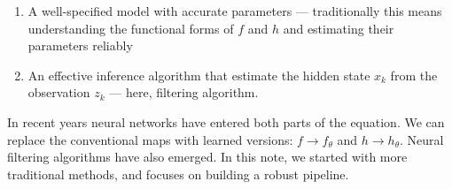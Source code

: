 \documentclass{article}
\begin{document}
\begin{enumerate}
    \item  A well-specified model with accurate parameters — traditionally this means understanding the functional forms of $f$ and $h$ and estimating their parameters reliably
    \item An effective inference algorithm that estimate the hidden state $x_k$ from the observation $z_k$ — here, filtering algorithm.
    \end{enumerate}
In recent years neural networks have entered both parts of the equation. We can replace the conventional maps with learned versions: $f \to f_\theta$ and $h \to h_\theta$. Neural filtering algorithms have also emerged. In this note, we started with more traditional methods, and focuses on building a robust pipeline. 


\end{document}
